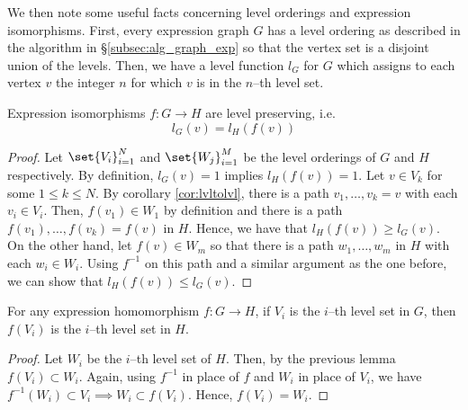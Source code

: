 \documentclass[./Thick_TQFTs_and_Quantum_Information.tex]{subfiles}
\begin{document}
We then note some useful facts concerning level orderings and expression
isomorphisms. First, every expression graph $G$ has a level ordering as
described in the algorithm in \S\ref{subsec:alg_graph_exp} so that the vertex
set is a disjoint union of the levels. Then, we have a level function $l_G$ for
$G$ which assigns to each vertex $v$ the integer $n$ for which $v$ is in the
$n$--th level set.

\begin{lem}\label{thm:expiso_lvlpres}
Expression isomorphisms $f : G \to H$ are level preserving, i.e.
\[
  l_G(v) = l_H(f(v))
\]
\end{lem}
\begin{proof}
Let
$\set{V_i}_{i = 1}^{N}$ and
$\set{W_j}_{i = 1}^{M}$ be the level orderings of $G$ and $H$
respectively. By definition, $l_G(v) = 1$ implies
$l_H(f(v)) = 1$. Let $v \in V_k$ for some $1 \leq k \leq N$.
By corollary \ref{cor:lvltolvl}, there is a path $v_1, \dots, v_k = v$ with each
$v_i \in V_i$. Then, $f(v_1) \in W_1$ by definition and there is a path
$f(v_1), \dots, f(v_k) = f(v)$ in $H$. Hence, we have that
$l_H(f(v)) \geq l_G(v)$. On the other hand, let $f(v) \in W_m$ so that there is
a path $w_1, \dots, w_m$ in $H$ with each $w_i \in W_i$. Using $f^{-1}$ on this
path and a similar argument as the one before, we can show that
$l_H(f(v)) \leq l_G(v)$.
\end{proof}

\begin{cor}
For any expression homomorphism $f : G \to H$, if $V_i$ is the $i$--th level set
in $G$, then $f(V_i)$ is the $i$--th level set in $H$.
\end{cor}
\begin{proof}
Let $W_i$ be the $i$--th level set of $H$. Then, by the previous lemma
$f(V_i) \subset W_i$. Again, using $f^{-1}$ in place of $f$ and $W_i$ in place
of $V_i$, we have
$f^{-1}(W_i) \subset V_i \implies W_i \subset f(V_i)$. Hence, $f(V_i) = W_i$.
\end{proof}
\end{document}
